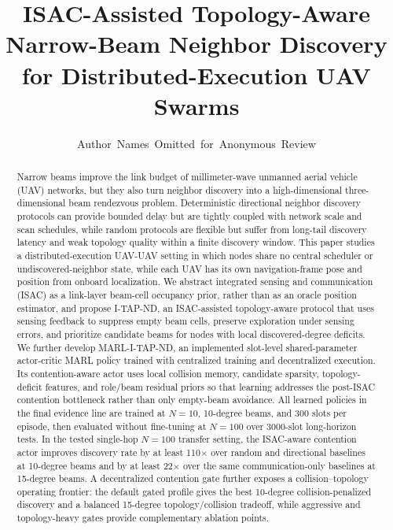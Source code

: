 \documentclass[journal]{IEEEtran}
\newcommand{\method}{I-TAP-ND}
\newcommand{\learnedmethod}{MARL-I-TAP-ND}
\begin{document}
\title{ISAC-Assisted Topology-Aware Narrow-Beam Neighbor Discovery for Distributed-Execution UAV Swarms}

\author{Author~Names~Omitted~for~Anonymous~Review}

\maketitle

\begin{abstract}
Narrow beams improve the link budget of millimeter-wave unmanned aerial vehicle (UAV) networks, but they also turn neighbor discovery into a high-dimensional three-dimensional beam rendezvous problem.
Deterministic directional neighbor discovery protocols can provide bounded delay but are tightly coupled with network scale and scan schedules, while random protocols are flexible but suffer from long-tail discovery latency and weak topology quality within a finite discovery window.
This paper studies a distributed-execution UAV-UAV setting in which nodes share no central scheduler or undiscovered-neighbor state, while each UAV has its own navigation-frame pose and position from onboard localization.
We abstract integrated sensing and communication (ISAC) as a link-layer beam-cell occupancy prior, rather than as an oracle position estimator, and propose \method{}, an ISAC-assisted topology-aware protocol that uses sensing feedback to suppress empty beam cells, preserve exploration under sensing errors, and prioritize candidate beams for nodes with local discovered-degree deficits.
We further develop \learnedmethod{}, an implemented slot-level shared-parameter actor-critic MARL policy trained with centralized training and decentralized execution.
Its contention-aware actor uses local collision memory, candidate sparsity, topology-deficit features, and role/beam residual priors so that learning addresses the post-ISAC contention bottleneck rather than only empty-beam avoidance.
All learned policies in the final evidence line are trained at $N=10$, 10-degree beams, and 300 slots per episode, then evaluated without fine-tuning at $N=100$ over 3000-slot long-horizon tests.
In the tested single-hop $N=100$ transfer setting, the ISAC-aware contention actor improves discovery rate by at least 110$\times$ over random and directional baselines at 10-degree beams and by at least 22$\times$ over the same communication-only baselines at 15-degree beams.
A decentralized contention gate further exposes a collision--topology operating frontier: the default gated profile gives the best 10-degree collision-penalized discovery and a balanced 15-degree topology/collision tradeoff, while aggressive and topology-heavy gates provide complementary ablation points.
\end{abstract}
\end{document}
